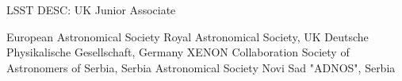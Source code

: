 \begin{scholarship}
					{LSST DESC: UK Junior Associate}
					
					{European Astronomical Society}
					{Royal Astronomical Society, UK}
					{Deutsche Physikalische Gesellschaft, Germany}
					{XENON Collaboration}
					{Society of Astronomers of Serbia, Serbia}					
					{Astronomical Society Novi Sad "ADNOS", Serbia}
  \emptySeparator					
\end{scholarship}